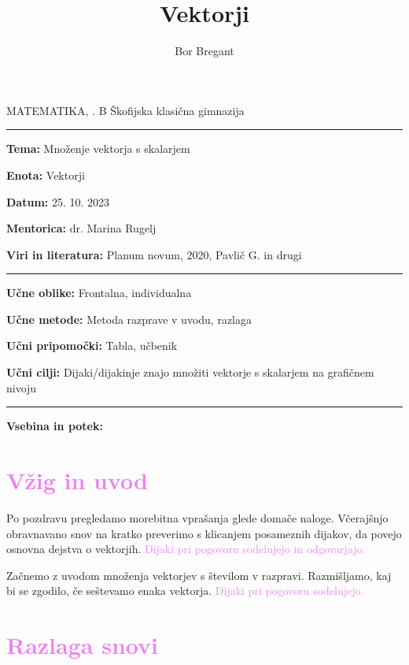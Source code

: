 \documentclass{article}
\title{Vektorji}
\author{Bor Bregant}
\date{\vspace{-5ex}}
\begin{document}
\thispagestyle{empty}	%

\noindent MATEMATIKA, . B \hfill Škofijska klasična gimnazija
\hrule
\vspace{1ex}
\noindent \textbf{Tema:} Množenje vektorja s skalarjem
\vspace{1ex}

\noindent \textbf{Enota:} Vektorji
\vspace{1ex}

\noindent \textbf{Datum:} 25. 10. 2023
\vspace{1ex}

\noindent \textbf{Mentorica:} dr. Marina Rugelj
\vspace{1ex}

\noindent \textbf{Viri in literatura:} Planum novum, 2020, Pavlič G. in drugi
\vspace{1ex}
\hrule
\vspace{2ex}
\noindent \textbf{Učne oblike:} Frontalna, individualna
\vspace{1ex}

\noindent \textbf{Učne metode:} Metoda razprave v uvodu, razlaga
\vspace{1ex}

\noindent \textbf{Učni pripomočki:} Tabla, učbenik
\vspace{1ex}

\noindent \textbf{Učni cilji:} Dijaki/dijakinje znajo množiti vektorje s skalarjem na grafičnem nivoju
\vspace{4ex}
\hrule
\vspace{5ex}
\noindent \textbf{Vsebina in potek:} 

\vspace{5ex}

\section*{\textcolor{violet}{Vžig in uvod}}

Po pozdravu pregledamo morebitna vprašanja glede domače naloge. Včerajšnjo obravnavano snov na kratko preverimo s klicanjem posameznih dijakov, da povejo osnovna dejstva o vektorjih. \textcolor{violet}{Dijaki pri pogovoru sodelujejo in odgovarjajo.}

Začnemo z uvodom množenja vektorjev s številom v razpravi. Razmišljamo, kaj bi se zgodilo, če seštevamo enaka vektorja. \textcolor{violet}{Dijaki pri pogovoru sodelujejo.}


\section*{\textcolor{violet}{Razlaga snovi}}
\end{document}
